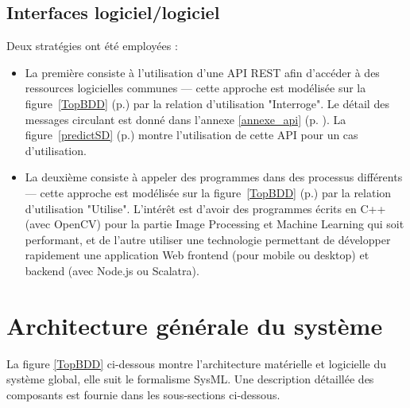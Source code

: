 	\subsection{Interfaces logiciel/logiciel}

Deux stratégies ont été employées :
\begin{itemize}
    \item La première consiste à l'utilisation d'une API REST afin d'accéder à des ressources logicielles communes --- cette approche est modélisée sur la figure~\ref{TopBDD} (p.\pageref{TopBDD}) par la relation d'utilisation "Interroge".
    Le détail des messages circulant est donné dans l'annexe \ref{annexe_api} (p. \pageref{annexe_api}).
    La figure~\ref{predictSD} (p.\pageref{predictSD}) montre l'utilisation de cette API pour un cas d'utilisation.
    \item La deuxième consiste à appeler des programmes dans des processus différents --- cette approche est modélisée sur la figure~\ref{TopBDD} (p.\pageref{TopBDD}) par la relation d'utilisation "Utilise".
    L'intérêt est d'avoir des programmes écrits en C++ (avec OpenCV) pour la partie Image Processing et Machine Learning qui soit performant, et de l'autre utiliser une technologie permettant de développer rapidement une application Web frontend (pour mobile ou desktop) et backend (avec Node.js ou Scalatra).
\end{itemize}

	
    \section{Architecture générale du système}
\label{sec:archi}

La figure \ref{TopBDD} ci-dessous montre l'architecture matérielle et logicielle du système global, elle suit le formalisme SysML.
Une description détaillée des composants est fournie dans les sous-sections ci-dessous.

